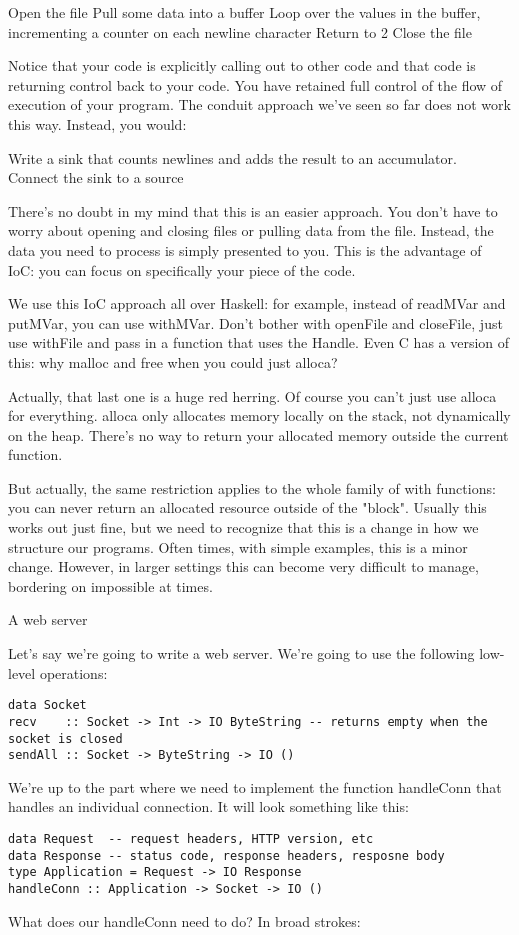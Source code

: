   
   Open the file
   Pull some data into a buffer
   Loop over the values in the buffer, incrementing a counter on each newline character
   Return to 2
   Close the file
  
Notice that your code is explicitly calling out to other code and that code is returning
control back to your code. You have retained full control of the flow of execution of your
program. The conduit approach we've seen so far does not work this way. Instead, you
would:
  
Write a sink that counts newlines and adds the result to an accumulator.
Connect the sink to a source
  
There's no doubt in my mind that this is an easier approach. You don't have to worry about
opening and closing files or pulling data from the file. Instead, the data you need to
process is
simply presented to you. This is the advantage of IoC: you can focus on specifically your
piece
of the code.

We use this IoC approach all over Haskell: for example, instead of readMVar
and putMVar, you can use withMVar. Don't bother with
openFile and closeFile, just use withFile and
pass in a function that uses the Handle. Even C has a version of this: why
malloc and free when you could just alloca?

Actually, that last one is a huge red herring. Of course you can't just use
alloca for everything. alloca only allocates memory locally on
the stack, not dynamically on the heap. There's no way to return your allocated memory
outside
the current function.

But actually, the same restriction applies to the whole family of with
functions: you can never return an allocated resource outside of the "block". Usually this
works
out just fine, but we need to recognize that this is a change in how we structure our
programs. Often times, with simple examples, this is a minor change. However, in larger
settings
this can become very difficult to manage, bordering on impossible at times.

A web server

Let's say we're going to write a web server. We're going to use the following low-level
operations:
\begin{lstlisting}
data Socket
recv    :: Socket -> Int -> IO ByteString -- returns empty when the socket is closed
sendAll :: Socket -> ByteString -> IO ()
\end{lstlisting}
We're up to the part where we need to implement the function handleConn that
handles an individual connection. It will look something like this:
\begin{lstlisting}
data Request  -- request headers, HTTP version, etc
data Response -- status code, response headers, resposne body
type Application = Request -> IO Response
handleConn :: Application -> Socket -> IO ()
\end{lstlisting}
What does our handleConn need to do? In broad strokes:

